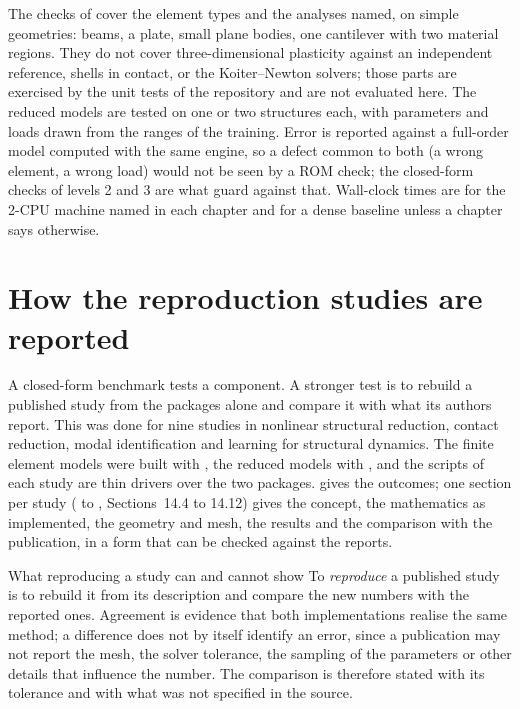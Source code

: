 The checks of  cover the element types and the analyses named, on simple geometries: beams, a plate, small plane bodies, one cantilever with two material regions. They do not cover three-dimensional plasticity against an independent reference, shells in contact, or the Koiter--Newton solvers; those parts are exercised by the unit tests of the repository and are not evaluated here. The reduced models are tested on one or two structures each, with parameters and loads drawn from the ranges of the training. Error is reported against a full-order model computed with the same engine, so a defect common to both (a wrong element, a wrong load) would not be seen by a ROM check; the closed-form checks of levels 2 and 3 are what guard against that. Wall-clock times are for the 2-CPU machine named in each chapter and for a dense baseline unless a chapter says otherwise.

\section{How the reproduction studies are reported}\label{sec:vf-repro}

A closed-form benchmark tests a component. A stronger test is to rebuild a published study from the packages alone and compare it with what its authors report. This was done for nine studies in nonlinear structural reduction, contact reduction, modal identification and learning for structural dynamics. The finite element models were built with \fea{}, the reduced models with \rom{}, and the scripts of each study are thin drivers over the two packages.  gives the outcomes; one section per study ( to , Sections~14.4 to 14.12) gives the concept, the mathematics as implemented, the geometry and mesh, the results and the comparison with the publication, in a form that can be checked against the reports.

\begin{sidenote}{What reproducing a study can and cannot show}
To \emph{reproduce} a published study is to rebuild it from its description and compare the new numbers with the reported ones. Agreement is evidence that both implementations realise the same method; a difference does not by itself identify an error, since a publication may not report the mesh, the solver tolerance, the sampling of the parameters or other details that influence the number. The comparison is therefore stated with its tolerance and with what was not specified in the source.
\end{sidenote}

